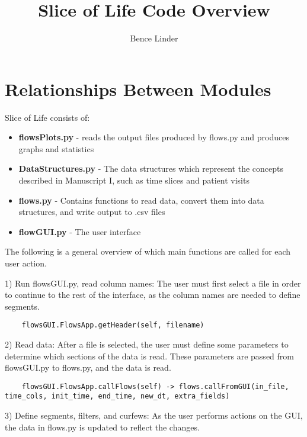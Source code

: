 \documentclass{article}
\begin{document}
\title{Slice of Life Code Overview}
\author{Bence Linder}

\maketitle

\section{Relationships Between Modules}

Slice of Life consists of: 

\begin{itemize}
	\item \textbf{flowsPlots.py} - reads the output files produced by flows.py and produces graphs and statistics
	\item \textbf{DataStructures.py} - The data structures which represent the concepts described in Manuscript I, such as time slices and patient visits
	\item \textbf{flows.py} - Contains functions to read data, convert them into data structures, and write output to .csv files
	\item \textbf{flowGUI.py} - The user interface
\end{itemize}

The following is a general overview of which main functions are called for each user action.

1) Run flowsGUI.py, read column names: The user must first select a file in order to continue to the rest of the interface, as the column names are needed to define segments.

\medskip

\begin{lstlisting}
	flowsGUI.FlowsApp.getHeader(self, filename)
\end{lstlisting}

2) Read data: After a file is selected, the user must define some parameters to determine which sections of the data is read. These parameters are passed from flowsGUI.py to flows.py, and the data is read.

\medskip

\begin{lstlisting}
	flowsGUI.FlowsApp.callFlows(self) -> flows.callFromGUI(in_file, time_cols, init_time, end_time, new_dt, extra_fields)
\end{lstlisting}
 
3) Define segments, filters, and curfews: As the user performs actions on the GUI, the data in flows.py is updated to reflect the changes.
\end{document}
